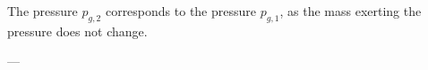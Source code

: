 The pressure \( p_{g,2} \) corresponds to the pressure \( p_{g,1} \), as the mass exerting the pressure does not change.  

---